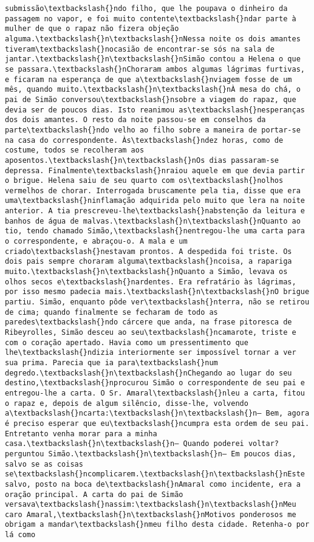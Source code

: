 \documentclass[11pt]{article}
\begin{document}
\begin{Verbatim}[commandchars=\\\{\}]
submissão\textbackslash{}ndo filho, que lhe poupava o dinheiro da passagem no vapor, e foi muito contente\textbackslash{}ndar parte à mulher de que o rapaz não fizera objeção alguma.\textbackslash{}n\textbackslash{}nNessa noite os dois amantes tiveram\textbackslash{}nocasião de encontrar-se sós na sala de jantar.\textbackslash{}n\textbackslash{}nSimão contou a Helena o que se passara.\textbackslash{}nChoraram ambos algumas lágrimas furtivas, e ficaram na esperança de que a\textbackslash{}nviagem fosse de um mês, quando muito.\textbackslash{}n\textbackslash{}nÀ mesa do chá, o pai de Simão conversou\textbackslash{}nsobre a viagem do rapaz, que devia ser de poucos dias. Isto reanimou as\textbackslash{}nesperanças dos dois amantes. O resto da noite passou-se em conselhos da parte\textbackslash{}ndo velho ao filho sobre a maneira de portar-se na casa do correspondente. Às\textbackslash{}ndez horas, como de costume, todos se recolheram aos aposentos.\textbackslash{}n\textbackslash{}nOs dias passaram-se depressa. Finalmente\textbackslash{}nraiou aquele em que devia partir o brigue. Helena saiu de seu quarto com os\textbackslash{}nolhos vermelhos de chorar. Interrogada bruscamente pela tia, disse que era uma\textbackslash{}ninflamação adquirida pelo muito que lera na noite anterior. A tia prescreveu-lhe\textbackslash{}nabstenção da leitura e banhos de água de malvas.\textbackslash{}n\textbackslash{}nQuanto ao tio, tendo chamado Simão,\textbackslash{}nentregou-lhe uma carta para o correspondente, e abraçou-o. A mala e um criado\textbackslash{}nestavam prontos. A despedida foi triste. Os dois pais sempre choraram alguma\textbackslash{}ncoisa, a rapariga muito.\textbackslash{}n\textbackslash{}nQuanto a Simão, levava os olhos secos e\textbackslash{}nardentes. Era refratário às lágrimas, por isso mesmo padecia mais.\textbackslash{}n\textbackslash{}nO brigue partiu. Simão, enquanto pôde ver\textbackslash{}nterra, não se retirou de cima; quando finalmente se fecharam de todo as paredes\textbackslash{}ndo cárcere que anda, na frase pitoresca de Ribeyrolles, Simão desceu ao seu\textbackslash{}ncamarote, triste e com o coração apertado. Havia como um pressentimento que lhe\textbackslash{}ndizia interiormente ser impossível tornar a ver sua prima. Parecia que ia para\textbackslash{}num degredo.\textbackslash{}n\textbackslash{}nChegando ao lugar do seu destino,\textbackslash{}nprocurou Simão o correspondente de seu pai e entregou-lhe a carta. O Sr. Amaral\textbackslash{}nleu a carta, fitou o rapaz e, depois de algum silêncio, disse-lhe, volvendo a\textbackslash{}ncarta:\textbackslash{}n\textbackslash{}n— Bem, agora é preciso esperar que eu\textbackslash{}ncumpra esta ordem de seu pai. Entretanto venha morar para a minha casa.\textbackslash{}n\textbackslash{}n— Quando poderei voltar? perguntou Simão.\textbackslash{}n\textbackslash{}n— Em poucos dias, salvo se as coisas se\textbackslash{}ncomplicarem.\textbackslash{}n\textbackslash{}nEste salvo, posto na boca de\textbackslash{}nAmaral como incidente, era a oração principal. A carta do pai de Simão versava\textbackslash{}nassim:\textbackslash{}n\textbackslash{}nMeu caro Amaral,\textbackslash{}n\textbackslash{}nMotivos ponderosos me obrigam a mandar\textbackslash{}nmeu filho desta cidade. Retenha-o por lá como 
\end{Verbatim}
\end{document}
